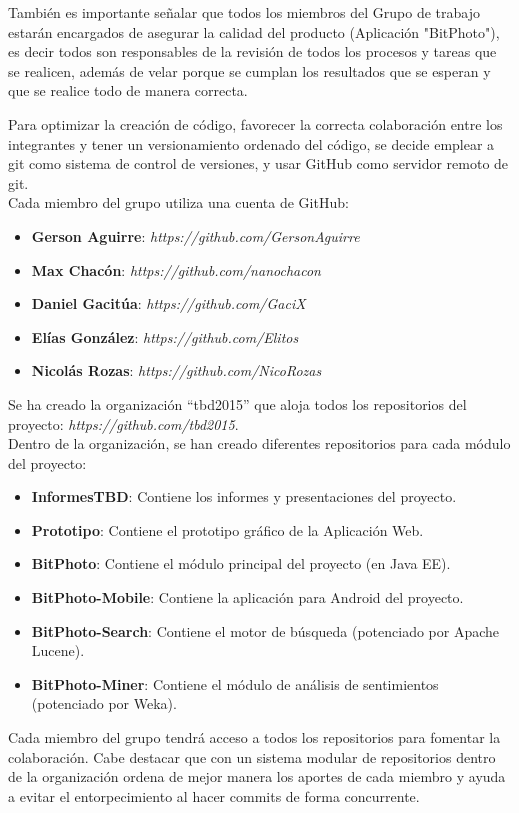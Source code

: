 \documentclass{memoria}
\begin{document}
También es importante señalar que todos los miembros del Grupo de trabajo estarán encargados de asegurar la calidad del producto (Aplicación "BitPhoto"), es decir todos son responsables de la revisión de todos los procesos y tareas que se realicen, además de velar porque se cumplan los resultados que se esperan y que se realice todo de manera correcta.\\




    
Para optimizar la creación de código, favorecer la correcta colaboración entre los integrantes y tener un versionamiento ordenado del código, se decide emplear a git como sistema de control de versiones, y usar GitHub como servidor remoto de git.\\

Cada miembro del grupo utiliza una cuenta de GitHub:

\begin{itemize}
	\item \textbf{Gerson Aguirre}: \textsl{https://github.com/GersonAguirre}
	\item \textbf{Max Chacón}: \textsl{https://github.com/nanochacon}
	\item \textbf{Daniel Gacitúa}: \textsl{https://github.com/GaciX}
	\item \textbf{Elías González}: \textsl{https://github.com/Elitos}
	\item \textbf{Nicolás Rozas}: \textsl{https://github.com/NicoRozas}
\end{itemize}

Se ha creado la organización “tbd2015” que aloja todos los repositorios del proyecto: \textsl{https://github.com/tbd2015}.\\

Dentro de la organización, se han creado diferentes repositorios para cada módulo del proyecto:

\begin{itemize}
	\item \textbf{InformesTBD}: Contiene los informes y presentaciones del proyecto. 
	\item \textbf{Prototipo}: Contiene el prototipo gráfico de la Aplicación Web.
	\item \textbf{BitPhoto}: Contiene el módulo principal del proyecto (en Java EE).
	\item \textbf{BitPhoto-Mobile}: Contiene la aplicación para Android del proyecto.
	\item \textbf{BitPhoto-Search}: Contiene el motor de búsqueda (potenciado por Apache Lucene).
	\item \textbf{BitPhoto-Miner}: Contiene el módulo de análisis de sentimientos (potenciado por Weka).
\end{itemize}

Cada miembro del grupo tendrá acceso a todos los repositorios para fomentar la colaboración. Cabe destacar que con un sistema modular de repositorios dentro de la organización ordena de mejor manera los aportes de cada miembro y ayuda a evitar el entorpecimiento al hacer commits de forma concurrente.

\end{document}
